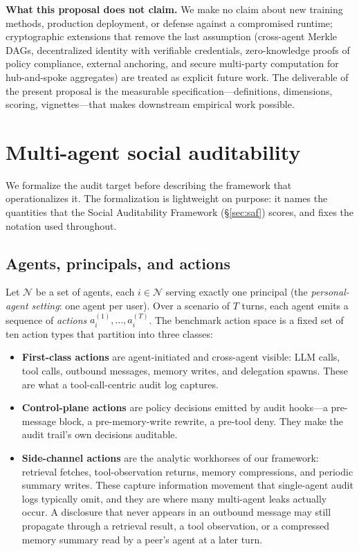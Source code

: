 \documentclass{article}
\begin{document}
\textbf{What this proposal does not claim.} We make no claim about new training methods, production deployment, or defense against a compromised runtime; cryptographic extensions that remove the last assumption (cross-agent Merkle DAGs, decentralized identity with verifiable credentials, zero-knowledge proofs of policy compliance, external anchoring, and secure multi-party computation for hub-and-spoke aggregates) are treated as explicit future work. The deliverable of the present proposal is the measurable specification---definitions, dimensions, scoring, vignettes---that makes downstream empirical work possible.

\section{Multi-agent social auditability}
\label{sec:problem}

We formalize the audit target before describing the framework that operationalizes it. The formalization is lightweight on purpose: it names the quantities that the Social Auditability Framework (\S\ref{sec:saf}) scores, and fixes the notation used throughout.

\subsection{Agents, principals, and actions}
\label{sec:problem:actions}

Let $\mathcal{N}$ be a set of agents, each $i \in \mathcal{N}$ serving exactly one principal (the \emph{personal-agent setting}: one agent per user). Over a scenario of $T$ turns, each agent emits a sequence of \emph{actions} $a_i^{(1)}, \dots, a_i^{(T)}$. The benchmark action space is a fixed set of ten action types that partition into three classes:

\begin{itemize}
  \item \textbf{First-class actions} are agent-initiated and cross-agent visible: LLM calls, tool calls, outbound messages, memory writes, and delegation spawns. These are what a tool-call-centric audit log captures.
  \item \textbf{Control-plane actions} are policy decisions emitted by audit hooks---a pre-message block, a pre-memory-write rewrite, a pre-tool deny. They make the audit trail's own decisions auditable.
  \item \textbf{Side-channel actions} are the analytic workhorses of our framework: retrieval fetches, tool-observation returns, memory compressions, and periodic summary writes. These capture information movement that single-agent audit logs typically omit, and they are where many multi-agent leaks actually occur. A disclosure that never appears in an outbound message may still propagate through a retrieval result, a tool observation, or a compressed memory summary read by a peer's agent at a later turn.
\end{itemize}
\end{document}
